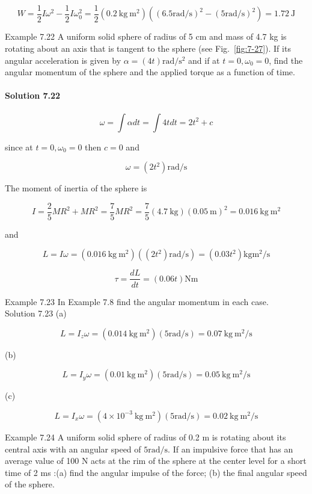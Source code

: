 \documentclass[10pt]{article}
\numberwithin{equation}{section}
\begin{document}
$$
W=\frac{1}{2} I \omega^{2}-\frac{1}{2} I \omega_{0}^{2}=\frac{1}{2}\left(0.2 \mathrm{~kg} \mathrm{~m}^{2}\right)\left((6.5 \mathrm{rad} / \mathrm{s})^{2}-(5 \mathrm{rad} / \mathrm{s})^{2}\right)=1.72 \mathrm{~J}
$$

Example 7.22 A uniform solid sphere of radius of 5 cm and mass of 4.7 kg is rotating about an axis that is tangent to the sphere (see Fig.~\ref{fig:7-27}). If its angular acceleration is given by $\alpha=(4 t) \mathrm{rad} / \mathrm{s}^{2}$ and if at $t=0, \omega_{0}=0$, find the angular momentum of the sphere and the applied torque as a function of time.

\paragraph*{Solution 7.22}
$$
\omega=\int \alpha d t=\int 4 t d t=2 t^{2}+c
$$

since at $t=0, \omega_{0}=0$ then $c=0$ and

$$
\omega=\left(2 t^{2}\right) \mathrm{rad} / \mathrm{s}
$$

The moment of inertia of the sphere is

$$
I=\frac{2}{5} M R^{2}+M R^{2}=\frac{7}{5} M R^{2}=\frac{7}{5}(4.7 \mathrm{~kg})(0.05 \mathrm{~m})^{2}=0.016 \mathrm{~kg} \mathrm{~m}^{2}
$$

and

$$
L=I \omega=\left(0.016 \mathrm{~kg} \mathrm{~m}^{2}\right)\left(\left(2 t^{2}\right) \mathrm{rad} / \mathrm{s}\right)=\left(0.03 t^{2}\right) \mathrm{kg} \mathrm{m}^{2} / \mathrm{s}
$$

$$
\tau=\frac{d L}{d t}=(0.06 t) \mathrm{N} \mathrm{m}
$$

Example 7.23 In Example 7.8 find the angular momentum in each case.\\
Solution 7.23 (a)

$$
L=I_{z} \omega=\left(0.014 \mathrm{~kg} \mathrm{~m}^{2}\right)(5 \mathrm{rad} / \mathrm{s})=0.07 \mathrm{~kg} \mathrm{~m}^{2} / \mathrm{s}
$$

(b)

$$
L=I_{y} \omega=\left(0.01 \mathrm{~kg} \mathrm{~m}^{2}\right)(5 \mathrm{rad} / \mathrm{s})=0.05 \mathrm{~kg} \mathrm{~m}^{2} / \mathrm{s}
$$

(c)

$$
L=I_{x} \omega=\left(4 \times 10^{-3} \mathrm{~kg} \mathrm{~m}^{2}\right)(5 \mathrm{rad} / \mathrm{s})=0.02 \mathrm{~kg} \mathrm{~m}^{2} / \mathrm{s}
$$

Example 7.24 A uniform solid sphere of radius of 0.2 m is rotating about its central axis with an angular speed of $5 \mathrm{rad} / \mathrm{s}$. If an impulsive force that has an average value of 100 N acts at the rim of the sphere at the center level for a short time of 2 ms :(a) find the angular impulse of the force; (b) the final angular speed of the sphere.
\end{document}
